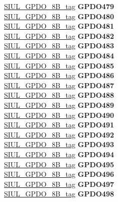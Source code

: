 \begin{DoxyCompactItemize}
\begin{tabbing}
\>\>\mbox{\hyperlink{unionSIUL__GPDO__8B__tag}{SIUL\_GPDO\_8B\_tag}} {\bfseries GPDO479}\\
\>\>\mbox{\hyperlink{unionSIUL__GPDO__8B__tag}{SIUL\_GPDO\_8B\_tag}} {\bfseries GPDO480}\\
\>\>\mbox{\hyperlink{unionSIUL__GPDO__8B__tag}{SIUL\_GPDO\_8B\_tag}} {\bfseries GPDO481}\\
\>\>\mbox{\hyperlink{unionSIUL__GPDO__8B__tag}{SIUL\_GPDO\_8B\_tag}} {\bfseries GPDO482}\\
\>\>\mbox{\hyperlink{unionSIUL__GPDO__8B__tag}{SIUL\_GPDO\_8B\_tag}} {\bfseries GPDO483}\\
\>\>\mbox{\hyperlink{unionSIUL__GPDO__8B__tag}{SIUL\_GPDO\_8B\_tag}} {\bfseries GPDO484}\\
\>\>\mbox{\hyperlink{unionSIUL__GPDO__8B__tag}{SIUL\_GPDO\_8B\_tag}} {\bfseries GPDO485}\\
\>\>\mbox{\hyperlink{unionSIUL__GPDO__8B__tag}{SIUL\_GPDO\_8B\_tag}} {\bfseries GPDO486}\\
\>\>\mbox{\hyperlink{unionSIUL__GPDO__8B__tag}{SIUL\_GPDO\_8B\_tag}} {\bfseries GPDO487}\\
\>\>\mbox{\hyperlink{unionSIUL__GPDO__8B__tag}{SIUL\_GPDO\_8B\_tag}} {\bfseries GPDO488}\\
\>\>\mbox{\hyperlink{unionSIUL__GPDO__8B__tag}{SIUL\_GPDO\_8B\_tag}} {\bfseries GPDO489}\\
\>\>\mbox{\hyperlink{unionSIUL__GPDO__8B__tag}{SIUL\_GPDO\_8B\_tag}} {\bfseries GPDO490}\\
\>\>\mbox{\hyperlink{unionSIUL__GPDO__8B__tag}{SIUL\_GPDO\_8B\_tag}} {\bfseries GPDO491}\\
\>\>\mbox{\hyperlink{unionSIUL__GPDO__8B__tag}{SIUL\_GPDO\_8B\_tag}} {\bfseries GPDO492}\\
\>\>\mbox{\hyperlink{unionSIUL__GPDO__8B__tag}{SIUL\_GPDO\_8B\_tag}} {\bfseries GPDO493}\\
\>\>\mbox{\hyperlink{unionSIUL__GPDO__8B__tag}{SIUL\_GPDO\_8B\_tag}} {\bfseries GPDO494}\\
\>\>\mbox{\hyperlink{unionSIUL__GPDO__8B__tag}{SIUL\_GPDO\_8B\_tag}} {\bfseries GPDO495}\\
\>\>\mbox{\hyperlink{unionSIUL__GPDO__8B__tag}{SIUL\_GPDO\_8B\_tag}} {\bfseries GPDO496}\\
\>\>\mbox{\hyperlink{unionSIUL__GPDO__8B__tag}{SIUL\_GPDO\_8B\_tag}} {\bfseries GPDO497}\\
\>\>\mbox{\hyperlink{unionSIUL__GPDO__8B__tag}{SIUL\_GPDO\_8B\_tag}} {\bfseries GPDO498}\\

\end{tabbing}
\end{DoxyCompactItemize}
